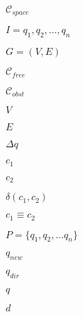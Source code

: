 \documentclass{article}
\begin{document}
$\mathcal{C}_{space}$
\pagebreak

$I={q_1, q_2, \ldots, q_n}$
\pagebreak

$G=(V, E)$
\pagebreak

$\mathcal{C}_{free}$
\pagebreak

$\mathcal{C}_{obst}$
\pagebreak

$V$
\pagebreak

$E$
\pagebreak

$\Delta q$
\pagebreak

$c_1$
\pagebreak

$c_2$
\pagebreak

$\delta(c_1, c_2)$
\pagebreak

$c_1 \equiv c_2$
\pagebreak

$P = \{q_1, q_2, \ldots q_n\}$
\pagebreak

$q_{new}$
\pagebreak

$q_{dir}$
\pagebreak

$q$
\pagebreak

$d$
\pagebreak
\end{document}
